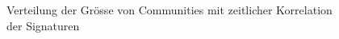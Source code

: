 \begin{figure}[t]
  \caption{Verteilung der Gr\"osse von Communities mit zeitlicher
    Korrelation der Signaturen}
  \label{fig:time-corrdist}
\end{figure}

